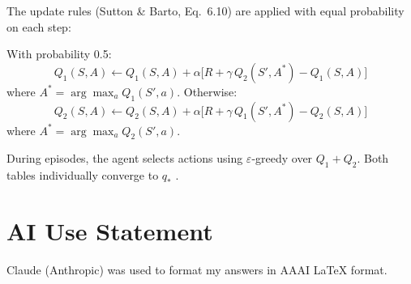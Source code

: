 \documentclass[letterpaper]{article}
\begin{document}
The update rules (Sutton \& Barto, Eq.~6.10) are applied with equal probability on each step:

With probability 0.5:
\begin{equation}
Q_1(S,A) \leftarrow Q_1(S,A) + \alpha\bigl[R + \gamma\, Q_2(S', A^*) - Q_1(S,A)\bigr]
\end{equation}
where $A^* = \arg\max_{a} Q_1(S',a)$. Otherwise:
\begin{equation}
Q_2(S,A) \leftarrow Q_2(S,A) + \alpha\bigl[R + \gamma\, Q_1(S', A^*) - Q_2(S,A)\bigr]
\end{equation}
where $A^* = \arg\max_{a} Q_2(S',a)$.

During episodes, the agent selects actions using $\varepsilon$-greedy over $Q_1 + Q_2$. Both tables individually converge to $q_*$ \citep{sutton2018reinforcement}.

\section*{AI Use Statement}

Claude (Anthropic) was used to format my answers in AAAI LaTeX format.


\end{document}
